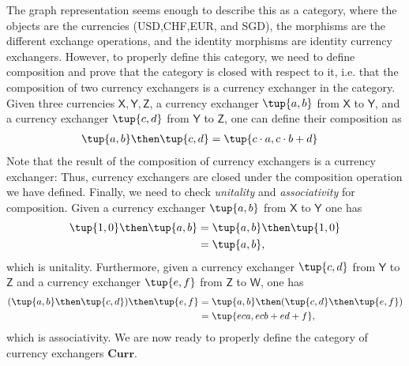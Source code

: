 The graph representation seems enough to describe this as a category, where the objects are the currencies (USD,CHF,EUR, and SGD), the morphisms are the different exchange operations, and the identity morphisms are identity currency exchangers. However, to properly define this category, we need to define composition and prove that the category is closed with respect to it, i.e. that the composition of two currency exchangers is a currency exchanger in the category. Given three currencies $\mathsf{X,Y,Z}$, a currency exchanger $\tup{a,b}$ from $\mathsf{X}$ to $\mathsf{Y}$, and a currency exchanger $\tup{c,d}$ from $\mathsf{Y}$ to $\mathsf{Z}$, one can define their composition as
\begin{equation}
\begin{aligned}
\label{eq:currencycomp}
    \tup{a,b}\then \tup{c,d}&=\tup{c\cdot a,c\cdot b+d}
\end{aligned}
\end{equation}
Note that the result of the composition of currency exchangers is a currency exchanger: Thus, currency exchangers are closed under the composition operation we have defined. Finally, we need to check \emph{unitality} and \emph{associativity} for composition. Given a currency exchanger $\tup{a,b}$ from $\mathsf{X}$ to $\mathsf{Y}$ one has
\begin{equation}
    \begin{aligned}
    \tup{1,0}\then \tup{a,b}&=\tup{a,b}\then \tup{1,0}\\
    &=\tup{a,b},
    \end{aligned}
\end{equation}
which is unitality. Furthermore, given a currency exchanger $\tup{c,d}$ from $\mathsf{Y}$ to $\mathsf{Z}$ and a currency exchanger $\tup{e,f}$ from $\mathsf{Z}$ to $\mathsf{W}$, one has
\begin{equation}
    \begin{aligned}
    (\tup{a,b}\then \tup{c,d})\then \tup{e,f}&=\tup{a,b}\then( \tup{c,d}\then \tup{e,f})\\
    &=\tup{eca, ecb+ed+f},
    \end{aligned}
\end{equation}
which is associativity.
We are now ready to properly define the category of currency exchangers $\mathbf{Curr}$.

